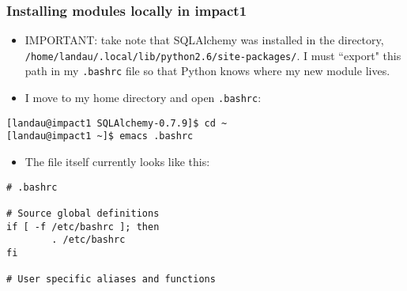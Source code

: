 \documentclass[handout]{beamer}
\numberwithin{equation}{section}
\begin{document}
\begin{frame}[fragile]
\frametitle{Installing modules locally in impact1}

\begin{itemize} \scriptsize
\item IMPORTANT: take note that SQLAlchemy was installed in the directory, {\tt /home/landau/.local/lib/python2.6/site-packages/}. I must ``export" this path in my {\tt .bashrc} file so that Python knows where my new module lives. 
\pause \item I move to my home directory and open {\tt .bashrc}:
\end{itemize}

\begin{lstlisting}[name=pkg]
[landau@impact1 SQLAlchemy-0.7.9]$ cd ~
[landau@impact1 ~]$ emacs .bashrc
\end{lstlisting}


\pause
\begin{itemize}
\item The file itself currently looks like this:
\end{itemize}

\begin{lstlisting}[name=bashrc]
# .bashrc                                                                                                             

# Source global definitions                                                                                           
if [ -f /etc/bashrc ]; then
        . /etc/bashrc
fi

# User specific aliases and functions
\end{lstlisting}
\end{frame}
\end{document}
